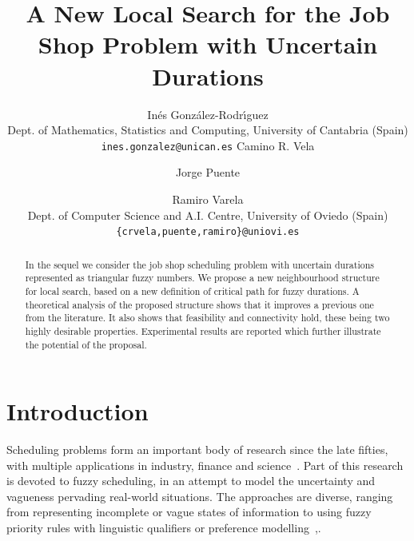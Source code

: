 \documentclass[letterpaper]{article}
\begin{document}
\title{A New Local Search for the Job Shop Problem with Uncertain Durations}

\author{In\'es Gonz\'alez-Rodr\'{\i}guez\\
    Dept. of Mathematics, Statistics and Computing, University of Cantabria (Spain)\\ \texttt{ines.gonzalez@unican.es}
\AND Camino R. Vela \and Jorge Puente \and Ramiro Varela \\
    Dept. of Computer Science and A.I. Centre, University of Oviedo (Spain)\\ \texttt{\{crvela,puente,ramiro\}@uniovi.es}
}

\maketitle

\begin{abstract}
In the sequel we consider the job shop scheduling problem with uncertain durations represented as triangular fuzzy numbers. We propose a new neighbourhood structure for local search, based on a new definition of critical path for fuzzy durations. A theoretical analysis of the proposed structure shows that it improves a previous one from the literature. It also shows that feasibility and connectivity hold, these being two highly desirable properties. Experimental results are reported which further illustrate the potential of the proposal.%
\end{abstract}

%
\section{Introduction}\label{secIntro}
Scheduling problems form an important body of research since the late fifties, with multiple applications in industry, finance and science~\cite{Brucker2006}. Part of this research is devoted to fuzzy scheduling, in an attempt to model the uncertainty and vagueness pervading real-world situations. The approaches are diverse, ranging from representing incomplete or vague states of information to using fuzzy priority rules with linguistic qualifiers or preference modelling~\cite{Dubois2003},\cite{Slowinski2000}.
\end{document}
